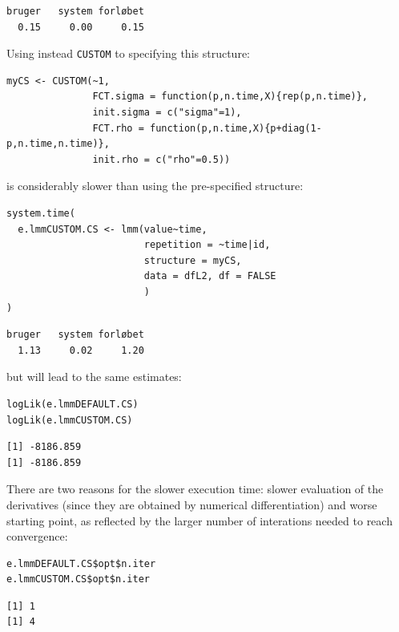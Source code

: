 \documentclass[12pt]{article}
\begin{document}
\begin{verbatim}
bruger   system forløbet 
  0.15     0.00     0.15
\end{verbatim}



Using instead \texttt{CUSTOM} to specifying this structure:
\lstset{language=r,label= ,caption= ,captionpos=b,numbers=none}
\begin{lstlisting}
myCS <- CUSTOM(~1,
               FCT.sigma = function(p,n.time,X){rep(p,n.time)},
               init.sigma = c("sigma"=1), 
               FCT.rho = function(p,n.time,X){p+diag(1-p,n.time,n.time)},
               init.rho = c("rho"=0.5))
\end{lstlisting}

is considerably slower than using the pre-specified structure:
\lstset{language=r,label= ,caption= ,captionpos=b,numbers=none}
\begin{lstlisting}
system.time(
  e.lmmCUSTOM.CS <- lmm(value~time,
                        repetition = ~time|id,
                        structure = myCS, 
                        data = dfL2, df = FALSE
                        )
)
\end{lstlisting}

\begin{verbatim}
bruger   system forløbet 
  1.13     0.02     1.20
\end{verbatim}



but will lead to the same estimates:
\lstset{language=r,label= ,caption= ,captionpos=b,numbers=none}
\begin{lstlisting}
logLik(e.lmmDEFAULT.CS)
logLik(e.lmmCUSTOM.CS)

\end{lstlisting}

\begin{verbatim}
[1] -8186.859
[1] -8186.859
\end{verbatim}


There are two reasons for the slower execution time: slower evaluation
of the derivatives (since they are obtained by numerical
differentiation) and worse starting point, as reflected by the larger
number of interations needed to reach convergence:
\lstset{language=r,label= ,caption= ,captionpos=b,numbers=none}
\begin{lstlisting}
e.lmmDEFAULT.CS$opt$n.iter
e.lmmCUSTOM.CS$opt$n.iter
\end{lstlisting}

\begin{verbatim}
[1] 1
[1] 4
\end{verbatim}
\end{document}
